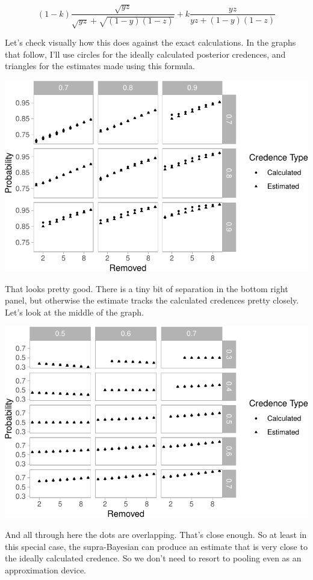 \documentclass[
  10pt,
  letterpaper,
  DIV=11,
  numbers=noendperiod,
  twoside]{scrartcl}
\begin{document}
\[
(1-k)\frac{\sqrt{yz}}{\sqrt{yz} + \sqrt{(1-y)(1-z)}} + k\frac{yz}{yz + (1-y)(1-z)}
\]

Let's check visually how this does against the exact calculations. In
the graphs that follow, I'll use circles for the ideally calculated
posterior credences, and triangles for the estimates made using this
formula.

\includegraphics{mixing-expert-opinion_files/figure-pdf/unnamed-chunk-5-1.pdf}

That looks pretty good. There is a tiny bit of separation in the bottom
right panel, but otherwise the estimate tracks the calculated credences
pretty closely. Let's look at the middle of the graph.

\includegraphics{mixing-expert-opinion_files/figure-pdf/unnamed-chunk-6-1.pdf}

And all through here the dots are overlapping. That's close enough. So
at least in this special case, the supra-Bayesian can produce an
estimate that is very close to the ideally calculated credence. So we
don't need to resort to pooling even as an approximation device.
\end{document}
